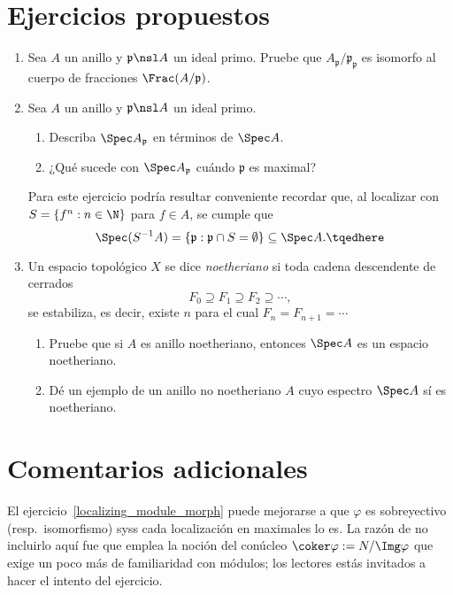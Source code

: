 \documentclass[11pt, reqno]{amsart}
\begin{document}
\section{Ejercicios propuestos}
\begin{enumerate}
	\item\lookright
		Sea $A$ un anillo y $\mathfrak{p} \nsl A$ un ideal primo.
		Pruebe que $A_{\mathfrak{p}}/\mathfrak{p_p}$ es isomorfo al cuerpo de fracciones
		$\Frac(A/\mathfrak{p})$.

	\item Sea $A$ un anillo y $\mathfrak{p} \nsl A$ un ideal primo.
		\begin{enumerate}
			\item Describa $\Spec A_{\mathfrak{p}}$ en términos de $\Spec A$.
			\item ¿Qué sucede con $\Spec A_{\mathfrak{p}}$ cuándo $\mathfrak{p}$ es maximal?
		\end{enumerate}

		\begin{hint}
			Para este ejercicio podría resultar conveniente recordar que, al localizar con $S = \{ f^n : n
			\in \N \}$ para $f \in A$, se cumple que
			\begin{equation}
				\Spec(S^{-1}A) = \{ \mathfrak{p} : \mathfrak{p} \cap S = \emptyset \} \subseteq \Spec A.
				\tqedhere
			\end{equation}
		\end{hint}

	\item Un espacio topológico $X$ se dice \emph{noetheriano} si toda cadena descendente de cerrados
		\[
			F_0 \supseteq F_1 \supseteq F_2 \supseteq \cdots,
		\]
		se estabiliza, es decir, existe $n$ para el cual $F_n = F_{n+1} = \cdots$

		\begin{enumerate}
			\item Pruebe que si $A$ es anillo noetheriano, entonces $\Spec A$ es un espacio noetheriano.
			\item\lookup
				Dé un ejemplo de un anillo no noetheriano $A$ cuyo espectro $\Spec A$ sí es noetheriano.
		\end{enumerate}
\end{enumerate}

\section{Comentarios adicionales}
El ejercicio~\ref{localizing_module_morph} puede mejorarse a que $\varphi$ es sobreyectivo (resp.\ isomorfismo) syss
cada localización en maximales lo es.
La razón de no incluirlo aquí fue que emplea la noción del conúcleo $\coker\varphi := N/\Img\varphi$ que exige un poco
más de familiaridad con módulos; los lectores estás invitados a hacer el intento del ejercicio.

\printbibliography
\end{document}

